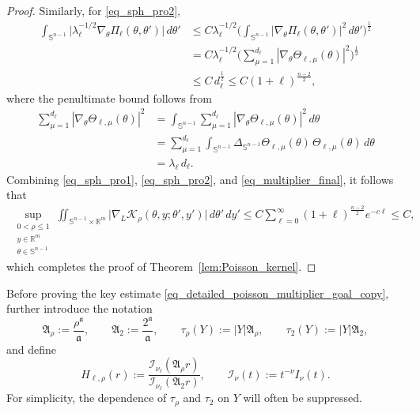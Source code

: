 \documentclass[12pt]{amsart}
\begin{document}
\begin{proof}
Similarly, for \eqref{eq_sph_pro2},
\begin{align*}
    \int_{\mathbb{S}^{n-1}} \bigl| \lambda_\ell^{-1/2} \nabla_{\theta} \Pi_\ell(\theta, \theta') \bigr| \, d\theta'
    &\le C \lambda_\ell^{-1/2} \biggl( \int_{\mathbb{S}^{n-1}} |\nabla_\theta \Pi_\ell(\theta,\theta')|^2 \, d\theta' \biggr)^{\frac{1}{2}}\\
    &= C \lambda_\ell^{-1/2} \biggl( \sum_{\mu=1}^{d_\ell} |\nabla_\theta \Theta_{\ell,\mu}(\theta)|^2 \biggr)^{\frac{1}{2}}\\
    &\le C \, d_\ell^{\frac{1}{2}}
    \le C (1+\ell)^{\frac{n-2}{2}},
\end{align*}
where the penultimate bound follows from
\begin{align*}
    \sum_{\mu=1}^{d_\ell} |\nabla_\theta \Theta_{\ell,\mu}(\theta)|^2
    &= \int_{\mathbb{S}^{n-1}} \sum_{\mu=1}^{d_\ell} |\nabla_\theta \Theta_{\ell,\mu}(\theta)|^2 \, d\theta\\
    &= \sum_{\mu=1}^{d_\ell} \int_{\mathbb{S}^{n-1}} \Delta_{\mathbb{S}^{n-1}} \Theta_{\ell,\mu}(\theta) \, \Theta_{\ell,\mu}(\theta) \, d\theta\\
    &= \lambda_\ell \, d_\ell.
\end{align*}
Combining \eqref{eq_sph_pro1}, \eqref{eq_sph_pro2}, and \eqref{eq_multiplier_final}, it follows that
\begin{align*}
    \sup_{\substack{0<\rho\le 1\\ y\in \mathbb{R}^{m}\\ \theta \in \mathbb{S}^{n-1}}} \iint_{\mathbb{S}^{n-1} \times \mathbb{R}^m} \bigl| \nabla_L \mathcal{K}_\rho (\theta,y; \theta', y') \bigr| \, d\theta' \, dy' \le C \sum_{\ell=0}^\infty (1+\ell)^{\frac{n-2}{2}} e^{-c\ell} \le C,
\end{align*}
which completes the proof of Theorem~\ref{lem:Poisson_kernel}.
\end{proof}

Before proving the key estimate \eqref{eq_detailed_poisson_multiplier_goal_copy}, further introduce the notation
\begin{equation*}
\mathfrak A_\rho:=\frac{\rho^{\mathfrak a}}{\mathfrak a},
\qquad
\mathfrak A_2:=\frac{2^{\mathfrak a}}{\mathfrak a},
\qquad
\tau_\rho(Y):= |Y| \mathfrak A_\rho,
\qquad
\tau_2(Y):=|Y|\mathfrak A_2,
\end{equation*}
and define
\begin{equation*}
H_{\ell,\rho}(r)
:=
\frac{\mathcal I_{\nu_\ell}(\mathfrak A_\rho r)}
{\mathcal I_{\nu_\ell}(\mathfrak A_2 r)},
\qquad
\mathcal I_\nu(t):=t^{-\nu}I_\nu(t).
\end{equation*}
For simplicity, the dependence of $\tau_\rho$ and $\tau_2$ on $Y$ will often be suppressed.
\end{document}
